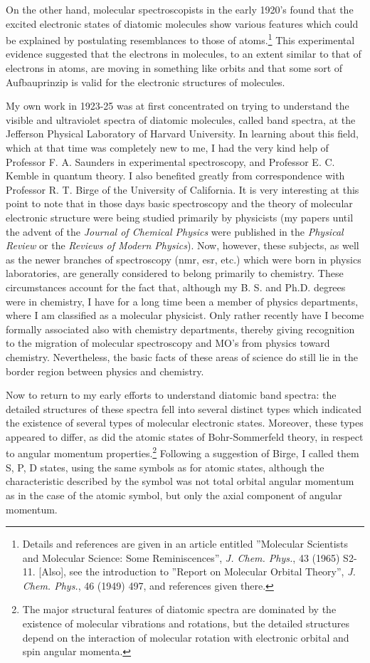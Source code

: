 \documentclass[11pt]{memoir}
\begin{document}
On the other hand, molecular spectroscopists in the early 1920's found that the excited electronic states of diatomic molecules show various features which could be explained by postulating resemblances to those of atoms.\footnote{Details and references are given in an article entitled ''Molecular Scientists and Molecular Science: Some Reminiscences'', \emph{J. Chem. Phys.}, 43 (1965) S2-11.  [Also], see the introduction to ''Report on Molecular Orbital Theory'', \emph{J. Chem. Phys.}, 46 (1949) 497, and references given there.}  This experimental evidence suggested that the electrons in molecules, to an extent similar to that of electrons in atoms, are moving in something like orbits and that some sort of Aufbauprinzip is valid for the electronic structures of molecules.

My own work in 1923-25 was at first concentrated on trying to understand the visible and ultraviolet spectra of diatomic molecules, called band spectra, at the Jefferson Physical Laboratory of Harvard University.  In learning about this field, which at that time was completely new to me, I had the very kind help of Professor F. A. Saunders in experimental spectroscopy, and Professor E. C. Kemble in quantum theory.  I also benefited greatly from correspondence with Professor R. T. Birge of the University of California.  It is very interesting at this point to note that in those days basic spectroscopy and the theory of molecular electronic structure were being studied primarily by physicists (my papers until the advent of the \emph{Journal of Chemical Physics} were published in the \emph{Physical Review} or the \emph{Reviews of Modern Physics}).  Now, however, these subjects, as well as the newer branches of spectroscopy (nmr, esr, etc.) which were born in physics laboratories, are generally considered to belong primarily to chemistry.  These circumstances account for the fact that, although my B. S. and Ph.D. degrees were in chemistry, I have for a long time been a member of physics departments, where I am classified as a molecular physicist.  Only rather recently have I become formally associated also with chemistry departments, thereby giving recognition to the migration of molecular spectroscopy and MO's from physics toward chemistry.  Nevertheless, the basic facts of these areas of science do still lie in the border region between physics and chemistry.

Now to return to my early efforts to understand diatomic band spectra: the detailed structures of these spectra fell into several distinct types which indicated the existence of several types of molecular electronic states.  Moreover, these types appeared to differ, as did the atomic states of Bohr-Sommerfeld theory, in respect to angular momentum properties.\footnote{The major structural features of diatomic spectra are dominated by the existence of molecular vibrations and rotations, but the detailed structures depend on the interaction of molecular rotation with electronic orbital and spin angular momenta.} Following a suggestion of Birge, I called them S, P, D states, using the same symbols as for atomic states, although the characteristic described by the symbol was not total orbital angular momentum as in the case of the atomic symbol, but only the axial component of angular momentum.
\end{document}
